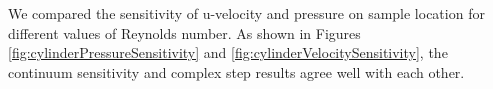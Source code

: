 \documentclass{aiaa-pretty}
\begin{document}
We compared the sensitivity of u-velocity and pressure on sample location for different values of Reynolds number. As shown in Figures \ref{fig:cylinderPressureSensitivity} and \ref{fig:cylinderVelocitySensitivity}, the continuum sensitivity and complex step results agree well with each other.

%
\begin{figure}[H]
	\centering
	\quad
	\\
	\quad
	\\

\end{figure}
\end{document}
